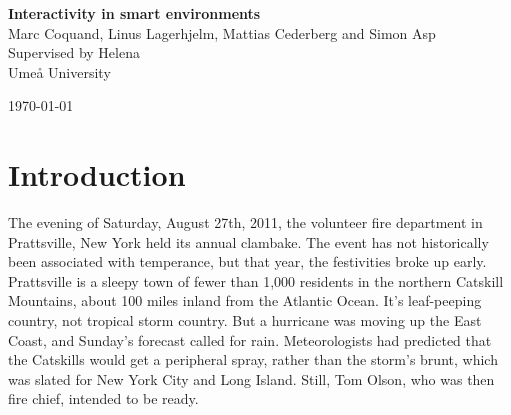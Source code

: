 \documentclass[twoside]{report}
\begin{document}
\begin{titlepage}
  \vspace{12cm}
	\raggedright
  {\Large \textbf{Interactivity in smart environments}\\}
  {\small\color{gray} Marc Coquand, Linus Lagerhjelm, Mattias Cederberg and Simon
  Asp\\}
  {\small\color{gray} Supervised by Helena}\\
  {\small\color{gray} Umeå University\\}

	\vfill

	{\large \today\par}
\end{titlepage}

\renewcommand{\baselinestretch}{1.0}

\newpage

\pagecolor{purplefront}\afterpage{\nopagecolor}\thispagestyle{empty}
 \newpage

\tableofcontents
\thispagestyle{empty}
\newpage

\section{Introduction}




The evening of
Saturday, August 27th, 2011, the volunteer fire department in Prattsville, New
York held its annual clambake. The event has not historically been associated
with temperance, but that year, the festivities broke up early. Prattsville is a
sleepy town of fewer than 1,000 residents in the northern Catskill Mountains,
about 100 miles inland from the Atlantic Ocean. It’s leaf-peeping country, not
tropical storm country. But a hurricane was moving up the East Coast, and
Sunday’s forecast called for rain. Meteorologists had predicted that the
Catskills would get a peripheral spray, rather than the storm’s brunt, which
was slated for New York City and Long Island. Still, Tom Olson, who was then
fire chief, intended to be ready.
\end{document}
